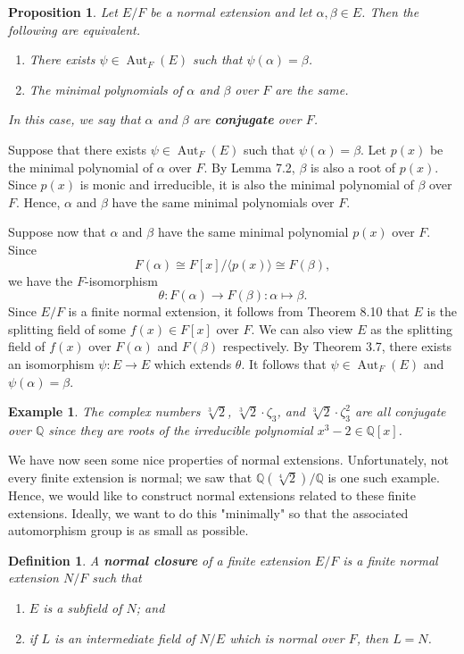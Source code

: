 \documentclass[10pt]{article}
\makeatletter
\newcommand{\Q}{\mathbb{Q}}
\DeclareMathOperator{\Aut}{Aut}
\theoremstyle{newstyle}
\newtheorem{prop}[thm]{Proposition}
\newtheorem{defn}[thm]{Definition}
\newtheorem{exmp}[thm]{Example}
\newenvironment{pf}[1][\proofname]{\par
  \pushQED{\qed}%
  \normalfont \topsep0\p@\relax
  \trivlist
  \item[\hskip\labelsep\scshape
  #1\@addpunct{.}]\ignorespaces
}{%
  \popQED\endtrivlist\@endpefalse
}
\makeatother
\begin{document}
\begin{prop}
Let $E/F$ be a normal extension and let $\alpha, \beta \in E$. Then the following are equivalent.
\begin{enumerate}[(1)]
    \item There exists $\psi \in \Aut_F(E)$ such that $\psi(\alpha) = \beta$. 
    \item The minimal polynomials of $\alpha$ and $\beta$ over $F$ are the same. 
\end{enumerate}
In this case, we say that $\alpha$ and $\beta$ are {\bf conjugate} over $F$. 
\end{prop}
\begin{pf}
Suppose that there exists $\psi \in \Aut_F(E)$ such that $\psi(\alpha) = \beta$. 
Let $p(x)$ be the minimal polynomial of $\alpha$ over $F$. By Lemma 7.2, $\beta$ is 
also a root of $p(x)$. Since $p(x)$ is monic and irreducible, it is also the minimal 
polynomial of $\beta$ over $F$. Hence, $\alpha$ and $\beta$ have the same minimal
polynomials over $F$. 

Suppose now that $\alpha$ and $\beta$ have the same minimal polynomial $p(x)$ over $F$. 
Since 
\[ F(\alpha) \cong F[x]/\langle p(x) \rangle \cong F(\beta), \]
we have the $F$-isomorphism 
\[ \theta : F(\alpha) \to F(\beta) : \alpha \mapsto \beta. \]
Since $E/F$ is a finite normal extension, it follows from Theorem 8.10 that $E$ is the 
splitting field of some $f(x) \in F[x]$ over $F$. We can also view $E$ as the splitting 
field of $f(x)$ over $F(\alpha)$ and $F(\beta)$ respectively. By Theorem 3.7, 
there exists an isomorphism $\psi : E \to E$ which extends $\theta$. It follows that 
$\psi \in \Aut_F(E)$ and $\psi(\alpha) = \beta$. 
\end{pf}

\begin{exmp}
The complex numbers $\sqrt[3]{2}$, $\sqrt[3]{2} \cdot \zeta_3$, and $\sqrt[3]{2} \cdot \zeta_3^2$ are all 
conjugate over $\Q$ since they are roots of the irreducible polynomial $x^3 - 2 \in \Q[x]$. 
\end{exmp}

We have now seen some nice properties of normal extensions. Unfortunately, not every 
finite extension is normal; we saw that $\Q(\sqrt[4]{2})/\Q$ is one such example.
Hence, we would like to construct normal extensions related to these finite extensions. 
Ideally, we want to do this "minimally" so that the associated automorphism group is 
as small as possible. 

\begin{defn}
A {\bf normal closure} of a finite extension $E/F$ is a finite normal extension $N/F$ such that 
\begin{enumerate}[(1)]
    \item $E$ is a subfield of $N$; and 
    \item if $L$ is an intermediate field of $N/E$ which is normal over $F$, then $L = N$. 
\end{enumerate}
\end{defn}
\end{document}

